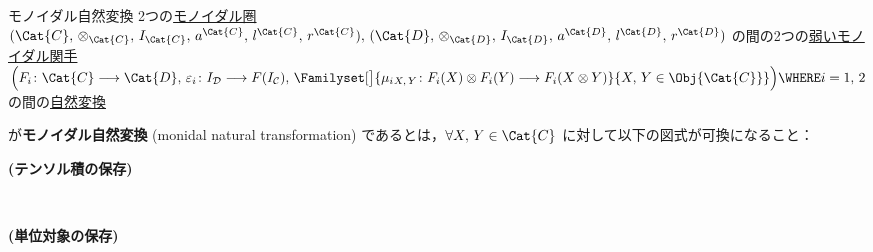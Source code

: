 \documentclass[TQFT_main]{subfiles}
\begin{document}
\begin{mydef}[label=def:monoidal-nat]{モノイダル自然変換}
    2つの\hyperref[redef:monoidal-category]{モノイダル圏} $(\Cat{C},\, \otimes_{\Cat{C}},\, I_{\Cat{C}},\, a^{\Cat{C}},\, l^{\Cat{C}},\, r^{\Cat{C}}),\, (\Cat{D},\, \otimes_{\Cat{D}},\, I_{\Cat{D}},\, a^{\Cat{D}},\, l^{\Cat{D}},\, r^{\Cat{D}})$ の間の2つの\hyperref[redef:monidal-functor]{弱いモノイダル関手}
    $\Bigl(F_i\colon \Cat{C} \lto \Cat{D},\, \varepsilon_i \colon I_{\mathcal{D}} \lto F(I_{\mathcal{C}}),\, \Familyset[\big]{\mu_i{}_{X,\, Y} \colon F_i(X) \otimes F_i(Y) \lto F_i(X \otimes Y)}{X,\, Y \in \Obj{\Cat{C}}}\Bigr)\WHERE i = 1,\, 2$
    の間の\hyperref[def:nat]{自然変換}
    \begin{center}
    \end{center}
    が\textbf{モノイダル自然変換} (monidal natural transformation) であるとは，$\forall X,\, Y \in \Cat{C}$ に対して以下の図式が可換になること：
    \begin{description}
        \item[\textbf{(テンソル積の保存)}]　
        
        \begin{center}
        \end{center}
        
        \item[\textbf{(単位対象の保存)}]　
        
        \begin{center}
        \end{center}
        
    \end{description}
    
\end{mydef}
\end{document}
